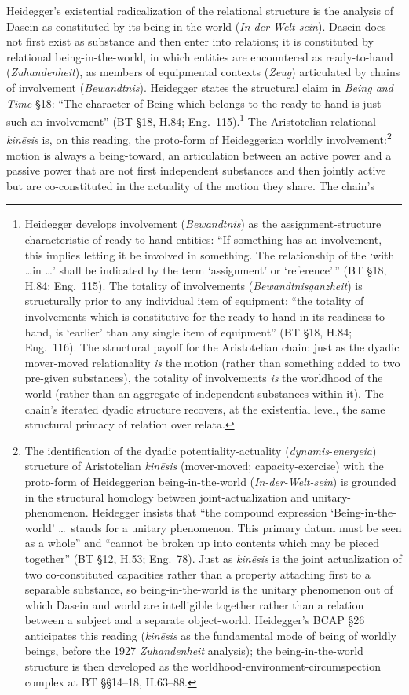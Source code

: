 \documentclass{article}
\begin{document}
Heidegger's existential radicalization of the relational structure is the analysis of Dasein as constituted by its being-in-the-world (\textit{In-der-Welt-sein}). Dasein does not first exist as substance and then enter into relations; it is constituted by relational being-in-the-world, in which entities are encountered as ready-to-hand (\textit{Zuhandenheit}), as members of equipmental contexts (\textit{Zeug}) articulated by chains of involvement (\textit{Bewandtnis}). Heidegger states the structural claim in \textit{Being and Time} \S 18: ``The character of Being which belongs to the ready-to-hand is just such an involvement'' (BT \S 18, H.84; Eng.~115).\footnote{Heidegger develops involvement (\textit{Bewandtnis}) as the assignment-structure characteristic of ready-to-hand entities: ``If something has an involvement, this implies letting it be involved in something. The relationship of the `with \ldots in \ldots ' shall be indicated by the term `assignment' or `reference'\,'' (BT §18, H.84; Eng.~115). The totality of involvements (\textit{Bewandtnisganzheit}) is structurally prior to any individual item of equipment: ``the totality of involvements which is constitutive for the ready-to-hand in its readiness-to-hand, is `earlier' than any single item of equipment'' (BT §18, H.84; Eng.~116). The structural payoff for the Aristotelian chain: just as the dyadic mover-moved relationality \textit{is} the motion (rather than something added to two pre-given substances), the totality of involvements \textit{is} the worldhood of the world (rather than an aggregate of independent substances within it). The chain's iterated dyadic structure recovers, at the existential level, the same structural primacy of relation over relata.} The Aristotelian relational \textit{kinēsis} is, on this reading, the proto-form of Heideggerian worldly involvement:\footnote{The identification of the dyadic potentiality-actuality (\textit{dynamis}-\textit{energeia}) structure of Aristotelian \textit{kinēsis} (mover-moved; capacity-exercise) with the proto-form of Heideggerian being-in-the-world (\textit{In-der-Welt-sein}) is grounded in the structural homology between joint-actualization and unitary-phenomenon. Heidegger insists that ``the compound expression `Being-in-the-world' \ldots\ stands for a unitary phenomenon. This primary datum must be seen as a whole'' and ``cannot be broken up into contents which may be pieced together'' (BT §12, H.53; Eng.~78). Just as \textit{kinēsis} is the joint actualization of two co-constituted capacities rather than a property attaching first to a separable substance, so being-in-the-world is the unitary phenomenon out of which Dasein and world are intelligible together rather than a relation between a subject and a separate object-world. Heidegger's BCAP §26 anticipates this reading (\textit{kinēsis} as the fundamental mode of being of worldly beings, before the 1927 \textit{Zuhandenheit} analysis); the being-in-the-world structure is then developed as the worldhood-environment-circumspection complex at BT §§14--18, H.63--88.} motion is always a being-toward, an articulation between an active power and a passive power that are not first independent substances and then jointly active but are co-constituted in the actuality of the motion they share. The chain's 
\end{document}
